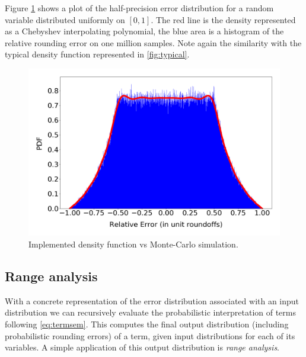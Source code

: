 \documentclass[10pt,conference]{IEEEtran}
\begin{document}
Figure \ref{fig:impl:errdist} shows a plot of the half-precision error distribution for a random variable distributed uniformly on $\left[0,1\right]$. The red line is the density represented as a Chebyshev interpolating polynomial, the blue area is a histogram of the relative rounding error on one million samples. Note again the similarity with the typical density function represented in \cref{fig:typical}.

\begin{figure}[h!]
\includegraphics[scale=0.22]{pics/Relative_Error_Distribution}
\caption{Implemented density function vs Monte-Carlo simulation.}
\label{fig:impl:errdist}
\end{figure}

\subsection{Range analysis}
With a concrete representation of the error distribution associated with an input distribution we can recursively evaluate the probabilistic interpretation of terms following \eqref{eq:termsem}. This computes the final output distribution (including probabilistic rounding errors) of a term, given input distributions for each of its variables. A simple application of this output distribution is \emph{range analysis}. 
\end{document}
